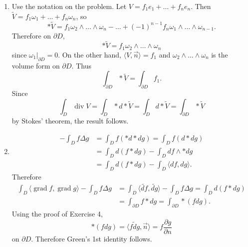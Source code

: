 \begin{enumerate}
s.t. $X_{1, p}, \ldots, X_{n, p}$ is orthonormal, 
and let $L(m)=\{g(X_{i, m}, X_{j, m})\}_{i, j}$ where $g$ is the given Riemannian metric. 
Then near $p \in X$, it is a smooth function to the set of $n \times n$ matrix. Also $L(p)=I$. 
Therefore locally $L$ is positive definite and also symmetric by definition. 
Thus there is $R$ s.t. $R^{2}=L$, which is also smooth and symmetric. 
Define $(Y_{1}, \ldots, Y_{n})^{t}=R^{-1}(X_{1}, \ldots, X_{n})^{t}$. 
Then we see that $g(Y_{i}, Y_{j})=\delta_{ij}$, which means that they are local orthonormal frame fields.
\item Use the notation on the problem. Let $V=f_{1} e_{1}+\ldots+f_{n} e_{n}$. 
Then $\tilde{V}=f_{1} \omega_{1}+\ldots+f_{n} \omega_{n}$, so
\[* \tilde{V}=f_{1} \omega_{2} \wedge \ldots \wedge \omega_{n}-\ldots+(-1)^{n-1} f_{n} \omega_{1} \wedge \ldots \wedge \omega_{n-1}.\]
Therefore on $\partial D$,
\[* \tilde{V}=f_{1} \omega_{2} \wedge \ldots \wedge \omega_{n}\]
since $\omega_{1}|_{\partial D}=0$. 
On the other hand, $\langle V, \vec{n}\rangle=f_{1}$ and $\omega_{2} \wedge \ldots \wedge \omega_{n}$ is the volume form on $\partial D$. Thus
\[\int_{\partial D} * \tilde{V}=\int_{\partial D} f_{1}.\]
Since
\[\int_{D} \operatorname{div} V=\int_{D} * d * \tilde{V}
=\int_{D} d * \tilde{V}=\int_{\partial D} * \tilde{V}\]
by Stokes' theorem, the result follows.
\item \begin{align*}
-\int_{D} f \Delta g&=\int_{D} f(* d * d g)=\int_{D} f(d * d g)\\
&=\int_{D} d(f * d g)-\int_{D} d f \wedge * d g\\
&=\int_{D} d(f * d g)-\int_{D}\langle d f, d g\rangle.
\end{align*}
Therefore
\begin{align*}
\int_{D}\langle \operatorname{grad} f, \operatorname{grad} g\rangle-\int_{D} f \Delta g
&=\int_{D}\langle\widetilde{d f}, \widetilde{d g}\rangle-\int_{D} f \Delta g=\int_{D} d(f * d g)\\
&=\int_{\partial D} f * d g=\int_{\partial D} *(f d g).
\end{align*}
Using the proof of Exercise 4,
\[*(f d g)=\langle\widetilde{f d g}, \vec{n}\rangle=f \frac{\partial g}{\partial n}\]
on $\partial D$. Therefore Green's 1st identity follows. 


\end{enumerate}
